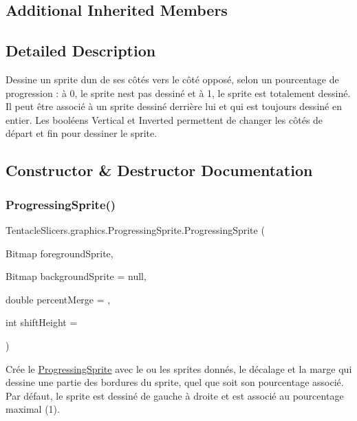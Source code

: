 \subsection*{Additional Inherited Members}


\subsection{Detailed Description}
Dessine un sprite d\textquotesingle{}un de ses côtés vers le côté opposé, selon un pourcentage de progression \+: à 0, le sprite n\textquotesingle{}est pas dessiné et à 1, le sprite est totalement dessiné. Il peut être associé à un sprite dessiné derrière lui et qui est toujours dessiné en entier. Les booléens Vertical et Inverted permettent de changer les côtés de départ et fin pour dessiner le sprite. 



\subsection{Constructor \& Destructor Documentation}
\mbox{\label{class_tentacle_slicers_1_1graphics_1_1_progressing_sprite_a3440006da44c22abde8a74d40a2b4d7f}} 
\subsubsection{\texorpdfstring{Progressing\+Sprite()}{ProgressingSprite()}}
{\footnotesize\ttfamily Tentacle\+Slicers.\+graphics.\+Progressing\+Sprite.\+Progressing\+Sprite (\begin{DoxyParamCaption}\item[{Bitmap}]{foreground\+Sprite,  }\item[{Bitmap}]{background\+Sprite = {\ttfamily null},  }\item[{double}]{percent\+Merge = {},  }\item[{int}]{shift\+Height = {} }\end{DoxyParamCaption})}



Crée le \hyperlink{class_tentacle_slicers_1_1graphics_1_1_progressing_sprite}{Progressing\+Sprite} avec le ou les sprites donnés, le décalage et la marge qui dessine une partie des bordures du sprite, quel que soit son pourcentage associé. Par défaut, le sprite est dessiné de gauche à droite et est associé au pourcentage maximal (1). 


